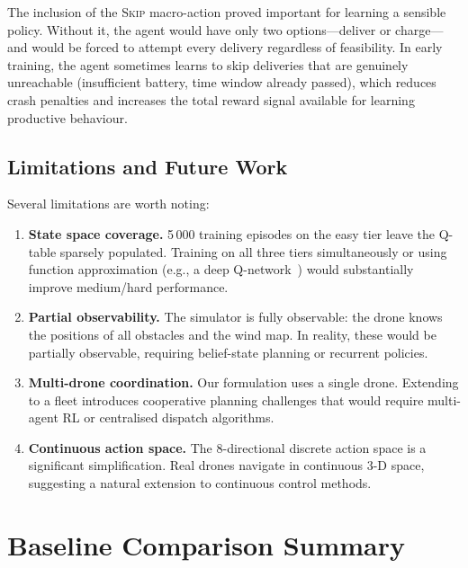 \documentclass[11pt,twocolumn]{article}
\begin{document}
The inclusion of the \textsc{Skip} macro-action proved important for
learning a sensible policy.
Without it, the agent would have only two options---deliver or charge---
and would be forced to attempt every delivery regardless of feasibility.
In early training, the agent sometimes learns to skip deliveries that
are genuinely unreachable (insufficient battery, time window already
passed), which reduces crash penalties and increases the total reward
signal available for learning productive behaviour.

\subsection{Limitations and Future Work}

Several limitations are worth noting:

\begin{enumerate}[leftmargin=*, nosep]
    \item \textbf{State space coverage.}
          5\,000 training episodes on the easy tier leave the Q-table
          sparsely populated. Training on all three tiers simultaneously
          or using function approximation (e.g., a deep Q-network~\cite{mnih2015})
          would substantially improve medium/hard performance.
    \item \textbf{Partial observability.}
          The simulator is fully observable: the drone knows the
          positions of all obstacles and the wind map.
          In reality, these would be partially observable, requiring
          belief-state planning or recurrent policies.
    \item \textbf{Multi-drone coordination.}
          Our formulation uses a single drone. Extending to a fleet
          introduces cooperative planning challenges that would require
          multi-agent RL or centralised dispatch algorithms.
    \item \textbf{Continuous action space.}
          The 8-directional discrete action space is a significant
          simplification. Real drones navigate in continuous
          3-D space, suggesting a natural extension to continuous
          control methods.
\end{enumerate}

\section{Baseline Comparison Summary}
\label{sec:baselines}
\end{document}
